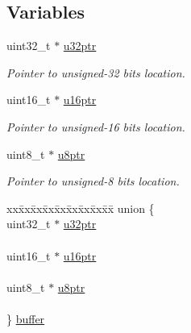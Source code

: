\subsection*{Variables}
\begin{DoxyCompactItemize}
\item 
uint32\+\_\+t $\ast$ \mbox{\hyperlink{group__fifo__group_ga00500224ac165192ac888251a076606d}{u32ptr}}
\begin{DoxyCompactList}\small\item\em Pointer to unsigned-\/32 bits location. \end{DoxyCompactList}\item 
uint16\+\_\+t $\ast$ \mbox{\hyperlink{group__fifo__group_ga15c8362aa58f36ae5de7f6180550d6b5}{u16ptr}}
\begin{DoxyCompactList}\small\item\em Pointer to unsigned-\/16 bits location. \end{DoxyCompactList}\item 
uint8\+\_\+t $\ast$ \mbox{\hyperlink{group__fifo__group_gacc04e057a962c975bbdf62664c52ff2c}{u8ptr}}
\begin{DoxyCompactList}\small\item\em Pointer to unsigned-\/8 bits location. \end{DoxyCompactList}\item 
\begin{tabbing}
xx\=xx\=xx\=xx\=xx\=xx\=xx\=xx\=xx\=\kill
union \{\\
\>uint32\_t $\ast$ \mbox{\hyperlink{group__fifo__group_ga00500224ac165192ac888251a076606d}{u32ptr}}\\
\>\\
\>uint16\_t $\ast$ \mbox{\hyperlink{group__fifo__group_ga15c8362aa58f36ae5de7f6180550d6b5}{u16ptr}}\\
\>\\
\>uint8\_t $\ast$ \mbox{\hyperlink{group__fifo__group_gacc04e057a962c975bbdf62664c52ff2c}{u8ptr}}\\
\>\\
\} \mbox{\hyperlink{group__fifo__group_ga83d6d4f3680146b2fed2c6cd33da9d59}{buffer}}\\


\end{tabbing}
\end{DoxyCompactItemize}

